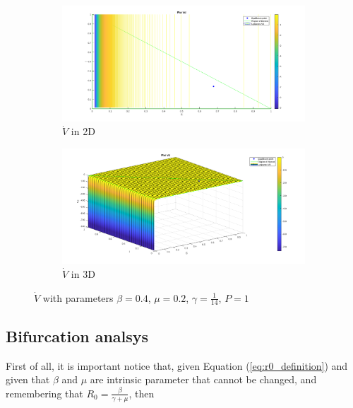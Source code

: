 \begin{figure}[h!]
    \centering
    \label{fig:lyapunov_derivative_r0_major_1}
    \begin{subfigure}{\textwidth}
        \centering
        \includegraphics[width=\linewidth]{Figure/lyapunov_derivative_2d_R0_major_1.png}  
        \caption{$\dot{V}$ in 2D}
        \label{fig:lyapunov_derivative_r0_major_1_first}
    \end{subfigure}
    \begin{subfigure}{\textwidth}
        \centering
        \includegraphics[width=\linewidth]{Figure/lyapunov_derivative_3d_R0_major_1.png}  
        \caption{$\dot{V}$ in 3D}
        \label{fig:lyapunov_derivative_r0_major_1_second}
    \end{subfigure}
    \caption{$\dot{V}$ with parameters $\beta = 0.4$, $\mu = 0.2$, $\gamma = \frac{1}{14}$, $P = 1$}
\end{figure}

\subsection{Bifurcation analsys}

First of all, it is important notice that, given Equation (\ref{eq:r0_definition}) and given that $\beta$ and $\mu$ are intrinsic parameter that cannot be changed, and remembering that $R_0 = \frac{\beta}{\gamma + \mu}$, then

